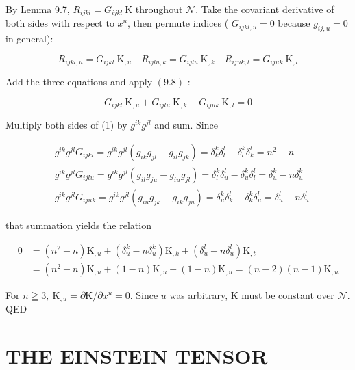 \documentclass[10pt]{article}
\begin{document}
By Lemma 9.7, $R_{i j k l}=G_{i j k l} \mathrm{~K}$ throughout $\mathcal{N}$. Take the covariant derivative of both sides with respect to $x^{u}$, then permute indices ( $G_{i j k l, u}=0$ because $g_{i j, u}=0$ in general):

$$
R_{i j k l, u}=G_{i j k l} \mathrm{~K}_{, u} \quad R_{i j l u, k}=G_{i j l u} \mathrm{~K}_{, k} \quad R_{i j u k, l}=G_{i j u k} \mathrm{~K}_{, l}
$$

Add the three equations and apply $(9.8)$ :


\begin{equation*}
G_{i j k l} \mathrm{~K}_{, u}+G_{i j l u} \mathrm{~K}_{, k}+G_{i j u k} \mathrm{~K}_{, l}=0 \tag{1}
\end{equation*}


Multiply both sides of (1) by $g^{i k} g^{j l}$ and sum. Since

$$
\begin{aligned}
& g^{i k} g^{j l} G_{i j k l}=g^{i k} g^{j l}\left(g_{i k} g_{j l}-g_{i l} g_{j k}\right)=\delta_{k}^{k} \delta_{l}^{l}-\delta_{l}^{k} \delta_{k}^{l}=n^{2}-n \\
& g^{i k} g^{j l} G_{i j l u}=g^{i k} g^{j l}\left(g_{i l} g_{j u}-g_{i u} g_{j l}\right)=\delta_{l}^{k} \delta_{u}^{l}-\delta_{u}^{k} \delta_{l}^{l}=\delta_{u}^{k}-n \delta_{u}^{k} \\
& g^{i k} g^{j l} G_{i j u k}=g^{i k} g^{j l}\left(g_{i u} g_{j k}-g_{i k} g_{j u}\right)=\delta_{u}^{k} \delta_{k}^{l}-\delta_{k}^{k} \delta_{u}^{l}=\delta_{u}^{l}-n \delta_{u}^{l}
\end{aligned}
$$

that summation yields the relation

$$
\begin{aligned}
0 & =\left(n^{2}-n\right) \mathrm{K}_{, u}+\left(\delta_{u}^{k}-n \delta_{u}^{k}\right) \mathrm{K}_{, k}+\left(\delta_{u}^{l}-n \delta_{u}^{l}\right) \mathrm{K}_{, t} \\
& =\left(n^{2}-n\right) \mathrm{K}_{, u}+(1-n) \mathrm{K}_{, u}+(1-n) \mathrm{K}_{, u}=(n-2)(n-1) \mathrm{K}_{, u}
\end{aligned}
$$

For $n \geqq 3, \mathrm{~K}_{, u}=\partial \mathrm{K} / \partial x^{u}=0$. Since $u$ was arbitrary, $\mathrm{K}$ must be constant over $\mathcal{N}$. QED

\section*{THE EINSTEIN TENSOR}
\end{document}
